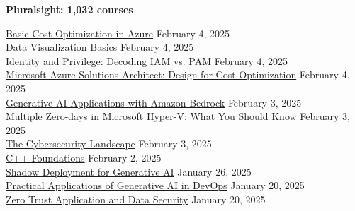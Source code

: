 \documentclass[10pt]{res} %
\begin{document}
\begin{resume}
\colorbox{pluralsight}{\color{white}\centerline{\bf Pluralsight: 1,032 courses}}

\href{https://bjdelacruz.dev/files/certificates/pluralsight/Basic_Cost_Optimization_in_Azure.pdf}{\color{blue}Basic Cost Optimization in Azure} \hfill February 4, 2025 \\
\href{https://bjdelacruz.dev/files/certificates/pluralsight/Data_Visualization_Basics.pdf}{\color{blue}Data Visualization Basics} \hfill February 4, 2025 \\
\href{https://bjdelacruz.dev/files/certificates/pluralsight/Identity_and_Privilege_-_Decoding_IAM_vs_PAM.pdf}{\color{blue}Identity and Privilege: Decoding IAM vs. PAM} \hfill February 4, 2025 \\
\href{https://bjdelacruz.dev/files/certificates/pluralsight/Microsoft_Azure_Solutions_Architect_-_Design_for_Cost_Optimization.pdf}{\color{blue}Microsoft Azure Solutions Architect: Design for Cost Optimization} \hfill February 4, 2025 \\
\href{https://bjdelacruz.dev/files/certificates/pluralsight/Generative_AI_Applications_with_Amazon_Bedrock.pdf}{\color{blue}Generative AI Applications with Amazon Bedrock} \hfill February 3, 2025 \\
\href{https://bjdelacruz.dev/files/certificates/pluralsight/Multiple_Zero-days_in_Microsoft_Hyper-V.pdf}{\color{blue}Multiple Zero-days in Microsoft Hyper-V: What You Should Know} \hfill February 3, 2025 \\
\href{https://bjdelacruz.dev/files/certificates/pluralsight/The_Cybersecurity_Landscape.pdf}{\color{blue}The Cybersecurity Landscape} \hfill February 3, 2025 \\
\href{https://bjdelacruz.dev/files/certificates/pluralsight/C_plus_plus_Foundations.pdf}{\color{blue}C++ Foundations} \hfill February 2, 2025 \\
\href{https://bjdelacruz.dev/files/certificates/pluralsight/Shadow_Deployment_for_Generative_AI.pdf}{\color{blue}Shadow Deployment for Generative AI} \hfill January 26, 2025 \\
\href{https://bjdelacruz.dev/files/certificates/pluralsight/Practical_Applications_of_Generative_AI_in_DevOps.pdf}{\color{blue}Practical Applications of Generative AI in DevOps} \hfill January 20, 2025 \\
\href{https://bjdelacruz.dev/files/certificates/pluralsight/Zero_Trust_Application_and_Data_Security.pdf}{\color{blue}Zero Trust Application and Data Security} \hfill January 20, 2025 \\

\end{resume}
\end{document}
